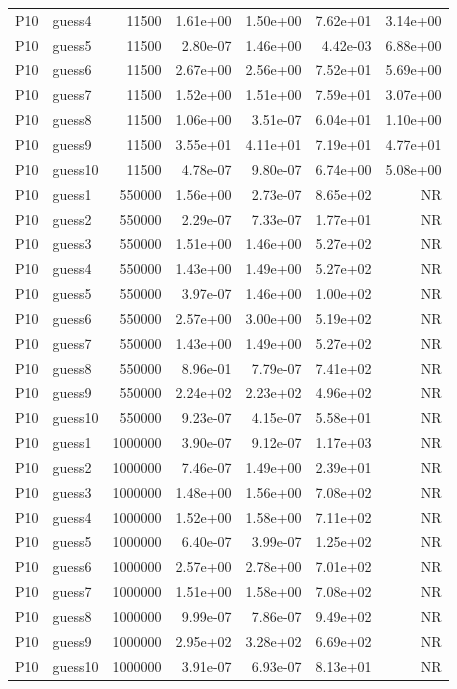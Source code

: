 {\begin{longtable}{llrrrrr}
P10 & guess4 & 11500 & 1.61e+00 & 1.50e+00 & 7.62e+01 & 3.14e+00 \\
P10 & guess5 & 11500 & 2.80e-07 & 1.46e+00 & 4.42e-03 & 6.88e+00 \\
P10 & guess6 & 11500 & 2.67e+00 & 2.56e+00 & 7.52e+01 & 5.69e+00 \\
P10 & guess7 & 11500 & 1.52e+00 & 1.51e+00 & 7.59e+01 & 3.07e+00 \\
P10 & guess8 & 11500 & 1.06e+00 & 3.51e-07 & 6.04e+01 & 1.10e+00 \\
P10 & guess9 & 11500 & 3.55e+01 & 4.11e+01 & 7.19e+01 & 4.77e+01 \\
P10 & guess10 & 11500 & 4.78e-07 & 9.80e-07 & 6.74e+00 & 5.08e+00 \\
P10 & guess1 & 550000 & 1.56e+00 & 2.73e-07 & 8.65e+02 & NR \\
P10 & guess2 & 550000 & 2.29e-07 & 7.33e-07 & 1.77e+01 & NR \\
P10 & guess3 & 550000 & 1.51e+00 & 1.46e+00 & 5.27e+02 & NR \\
P10 & guess4 & 550000 & 1.43e+00 & 1.49e+00 & 5.27e+02 & NR \\
P10 & guess5 & 550000 & 3.97e-07 & 1.46e+00 & 1.00e+02 & NR \\
P10 & guess6 & 550000 & 2.57e+00 & 3.00e+00 & 5.19e+02 & NR \\
P10 & guess7 & 550000 & 1.43e+00 & 1.49e+00 & 5.27e+02 & NR \\
P10 & guess8 & 550000 & 8.96e-01 & 7.79e-07 & 7.41e+02 & NR \\
P10 & guess9 & 550000 & 2.24e+02 & 2.23e+02 & 4.96e+02 & NR \\
P10 & guess10 & 550000 & 9.23e-07 & 4.15e-07 & 5.58e+01 & NR \\
P10 & guess1 & 1000000 & 3.90e-07 & 9.12e-07 & 1.17e+03 & NR \\
P10 & guess2 & 1000000 & 7.46e-07 & 1.49e+00 & 2.39e+01 & NR \\
P10 & guess3 & 1000000 & 1.48e+00 & 1.56e+00 & 7.08e+02 & NR \\
P10 & guess4 & 1000000 & 1.52e+00 & 1.58e+00 & 7.11e+02 & NR \\
P10 & guess5 & 1000000 & 6.40e-07 & 3.99e-07 & 1.25e+02 & NR \\
P10 & guess6 & 1000000 & 2.57e+00 & 2.78e+00 & 7.01e+02 & NR \\
P10 & guess7 & 1000000 & 1.51e+00 & 1.58e+00 & 7.08e+02 & NR \\
P10 & guess8 & 1000000 & 9.99e-07 & 7.86e-07 & 9.49e+02 & NR \\
P10 & guess9 & 1000000 & 2.95e+02 & 3.28e+02 & 6.69e+02 & NR \\
P10 & guess10 & 1000000 & 3.91e-07 & 6.93e-07 & 8.13e+01 & NR \\
\end{longtable}}


